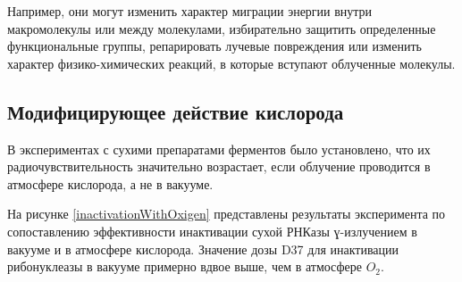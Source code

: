\documentclass[a4paper, 14pt]{article}
\begin{document}
Например, они могут изменить характер миграции энергии внутри макромолекулы или между молекулами, избирательно защитить определенные функциональные группы, репарировать лучевые повреждения или изменить характер физико-химических реакций, в которые вступают облученные молекулы.

\subsection{Модифицирующее действие кислорода}
В экспериментах с сухими препаратами ферментов было установлено, что их радиочувствительность значительно возрастает, если облучение проводится в атмосфере кислорода, а не в вакууме. 

На рисунке \ref{inactivationWithOxigen} представлены результаты эксперимента по сопоставлению эффективности инактивации сухой РНКазы ɣ-излучением в вакууме и в атмосфере кислорода. Значение дозы D37 для инактивации рибонуклеазы в вакууме примерно вдвое выше, чем в атмосфере $O_2$.
\end{document}
